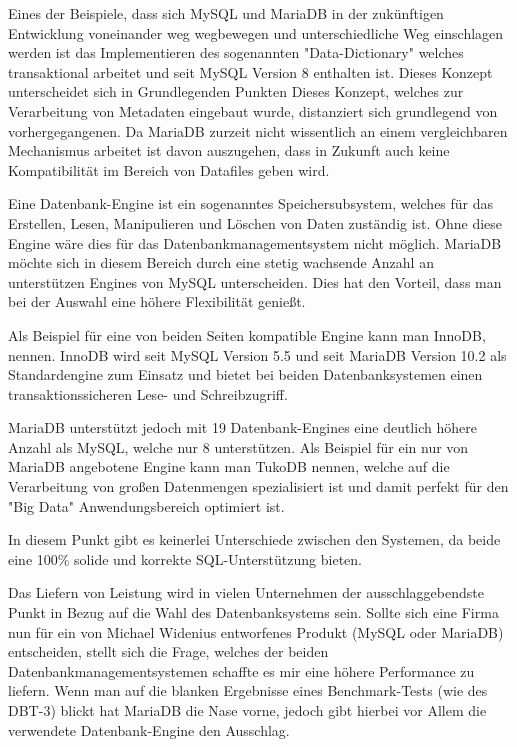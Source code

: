 Eines der Beispiele, dass sich MySQL und MariaDB in der zukünftigen Entwicklung voneinander weg wegbewegen und unterschiedliche Weg einschlagen werden ist das Implementieren des sogenannten "Data-Dictionary" welches transaktional arbeitet und seit MySQL Version 8 enthalten ist. Dieses Konzept unterscheidet sich in Grundlegenden Punkten Dieses Konzept, welches zur Verarbeitung von Metadaten eingebaut wurde, distanziert sich grundlegend von vorhergegangenen. Da MariaDB zurzeit nicht wissentlich an einem vergleichbaren Mechanismus arbeitet ist davon auszugehen, dass in Zukunft auch keine Kompatibilität im Bereich von Datafiles geben wird.


Eine Datenbank-Engine ist ein sogenanntes Speichersubsystem, welches für das Erstellen, Lesen, Manipulieren und Löschen von Daten zuständig ist. Ohne diese Engine wäre dies für das Datenbankmanagementsystem nicht möglich.
MariaDB möchte sich in diesem Bereich durch eine stetig wachsende Anzahl an unterstützen Engines von MySQL unterscheiden. Dies hat den Vorteil, dass man bei der Auswahl eine höhere Flexibilität genießt.

Als Beispiel für eine von beiden Seiten kompatible Engine kann man InnoDB, nennen. InnoDB wird seit MySQL Version 5.5 und seit MariaDB Version 10.2 als Standardengine zum Einsatz und bietet bei beiden Datenbanksystemen einen transaktionssicheren Lese- und Schreibzugriff.

MariaDB unterstützt jedoch mit 19 Datenbank-Engines eine deutlich höhere Anzahl als MySQL, welche nur 8 unterstützen. Als Beispiel für ein nur von MariaDB angebotene Engine kann man TukoDB nennen, welche auf die Verarbeitung von großen Datenmengen spezialisiert ist und damit perfekt für den "Big Data" Anwendungsbereich optimiert ist.


In diesem Punkt gibt es keinerlei Unterschiede zwischen den Systemen, da beide eine 100\% solide und korrekte SQL-Unterstützung bieten.


Das Liefern von Leistung wird in vielen Unternehmen der ausschlaggebendste Punkt in Bezug auf die Wahl des Datenbanksystems sein. Sollte sich eine Firma nun für ein von Michael Widenius entworfenes Produkt (MySQL oder MariaDB) entscheiden, stellt sich die Frage, welches der beiden Datenbankmanagementsystemen schaffte es mir eine höhere Performance zu liefern. Wenn man auf die blanken Ergebnisse eines Benchmark-Tests (wie des DBT-3) blickt hat MariaDB die Nase vorne, jedoch gibt hierbei vor Allem die verwendete Datenbank-Engine den Ausschlag.

